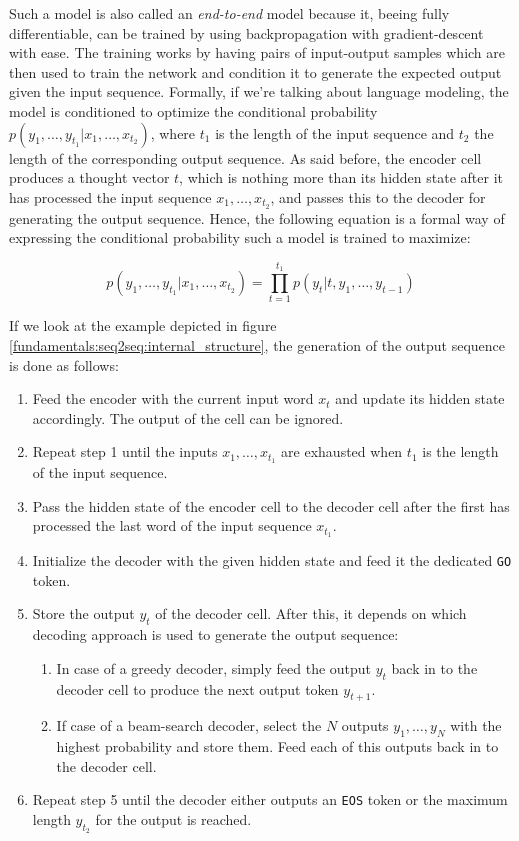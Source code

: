 Such a model is also called an \emph{end-to-end} model because it, beeing fully differentiable, can be trained by using backpropagation with gradient-descent with ease. The training works by having pairs of input-output samples which are then used to train the network and condition it to generate the expected output given the input sequence. Formally, if we're talking about language modeling, the model is conditioned to optimize the conditional probability $p(y_1,\dots,y_{t_1}|x_1,\dots,x_{t_2})$, where $t_1$ is the length of the input sequence and $t_2$ the length of the corresponding output sequence. As said before, the encoder cell produces a thought vector $t$, which is nothing more than its hidden state after it has processed the input sequence $x_1,\dots,x_{t_2}$, and passes this to the decoder for generating the output sequence. Hence, the following equation is a formal way of expressing the conditional probability such a model is trained to maximize:

\begin{equation}
p(y_1,\dots,y_{t_1}|x_1,\dots,x_{t_2}) = \prod_{t=1}^{t_1} p(y_t|t,y_1,\dots,y_{t-1})
\end{equation}

If we look at the example depicted in figure \ref{fundamentals:seq2seq:internal_structure}, the generation of the output sequence is done as follows:

\begin{enumerate}
	\item Feed the encoder with the current input word $x_t$ and update its hidden state accordingly. The output of the cell can be ignored.
	\item Repeat step 1 until the inputs $x_1,\dots,x_{t_1}$ are exhausted when $t_1$ is the length of the input sequence.
	\item Pass the hidden state of the encoder cell to the decoder cell after the first has processed the last word of the input sequence $x_{t_1}$.
	\item Initialize the decoder with the given hidden state and feed it the dedicated \texttt{GO} token.
	\item Store the output $y_t$ of the decoder cell. After this, it depends on which decoding approach is used to generate the output sequence:
	\begin{enumerate}
		\item In case of a greedy decoder, simply feed the output $y_t$ back in to the decoder cell to produce the next output token $y_{t+1}$.
		\item If case of a beam-search decoder, select the $N$ outputs $y_1,\dots,y_{N}$ with the highest probability and store them. Feed each of this outputs back in to the decoder cell.
	\end{enumerate}
	\item Repeat step 5 until the decoder either outputs an \texttt{EOS} token or the maximum length $y_{t_2}$ for the output is reached.
\end{enumerate}

